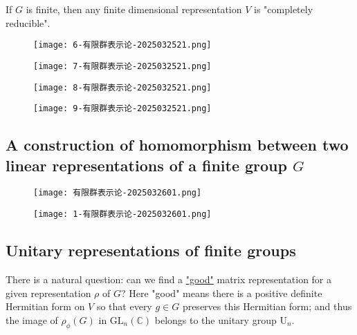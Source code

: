 \begin{note}
If $G$ is finite, then any finite dimensional representation $V$ is "completely reducible".
\begin{figure}[H]
\centering
\texttt{[image: 6-有限群表示论-2025032521.png]}
\label{}
\end{figure}
\begin{figure}[H]
\centering
\texttt{[image: 7-有限群表示论-2025032521.png]}
\label{}
\end{figure}
\begin{figure}[H]
\centering
\texttt{[image: 8-有限群表示论-2025032521.png]}
\label{}
\end{figure}
\begin{figure}[H]
\centering
\texttt{[image: 9-有限群表示论-2025032521.png]}
\label{}
\end{figure}
\end{note}
\subsection{A construction of homomorphism between two linear representations of a finite group \texorpdfstring{$G$}{G}}

\begin{figure}[H]
\centering
\texttt{[image: 有限群表示论-2025032601.png]}
\label{}
\end{figure}
\begin{figure}[H]
\centering
\texttt{[image: 1-有限群表示论-2025032601.png]}
\label{}
\end{figure}

\subsection{Unitary representations of finite groups}

There is a natural question: can we find a \underline{"good"} matrix representation for a given representation $\rho$ of $G$? Here "good" means there is a positive definite Hermitian form on $V$ so that every $g\in G$ preserves this Hermitian form; and thus the image of $\rho_{\phi}(G)$ in $\mathrm{GL}_{n}(\mathbb{C})$ belongs to the unitary group $\mathrm{U}_n$.


